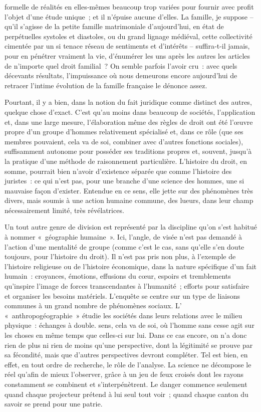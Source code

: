\documentclass[french,twoside]{book} %
\begin{document}
\label{p75} formelle de réalités en elles‑mêmes beaucoup trop variées pour fournir avec profit l’objet d’une étude unique ; et il n’épuise aucune d’elles. La famille, je suppose – qu’il s’agisse de la petite famille matrimoniale d’aujourd’hui, en état de perpétuelles systoles et diastoles, ou du grand lignage médiéval, cette collectivité cimentée par un si tenace réseau de sentiments et d’in­térêts – suffira‑t‑il jamais, pour en pénétrer vraiment la vie, d’énumérer les uns après les autres les articles de n’importe quel droit familial ? On semble parfois l’avoir cru : avec quels décevants résultats, l’impuissance où nous demeurons encore aujourd’hui de retracer l’intime évolution de la famille française le dénonce assez.\par
Pourtant, il y a bien, dans la notion du fait juridique comme distinct des autres, quelque chose d’exact. C’est qu’au moins dans beaucoup de sociétés, l’application et, dans une large mesure, l’élaboration même des règles de droit ont été l’œuvre propre d’un groupe d’hommes relativement spécialisé et, dans ce rôle (que ses membres pouvaient, cela va de soi, combiner avec d’autres fonctions sociales), suffisamment autonome pour posséder ses traditions propres et, souvent, jusqu’à la pratique d’une méthode de raisonnement particulière. L’histoire du droit, en somme, pourrait bien n’avoir d’existence séparée que comme l’histoire des juristes : ce qui n’est pas, pour une branche d’une science des hommes, une si mauvaise façon d’exister. Entendue en ce sens, elle jette sur des phéno­mènes très divers, mais soumis à une action humaine commune, des lueurs, dans leur champ nécessairement limité, très révélatrices.\par
Un tout autre genre de division est représenté par la discipline qu’on s’est habitué à nommer « géographie humaine ». Ici, l’angle, de visée n’est pas demandé à l’action d’une mentalité de groupe (comme c’est le cas, sans qu’elle s’en doute toujours, pour l’histoire du droit). Il n’est pas pris non plus, à l’exemple de l’histoire religieuse ou de l’histoire écono­mique, dans la nature spécifique d’un fait humain : croyances, émotions, effusions du cœur, espoirs et tremblements qu’inspire l’image de forces transcendantes à l’humanité ; efforts pour satisfaire et organiser les besoins matériels. L’enquête se centre sur un type de liaisons communes à un grand nombre de phénomènes sociaux. L’ « anthropogéographie » étudie les sociétés dans leurs relations avec le milieu physique : échanges à double. sens, cela va de soi, où l’homme sans cesse agit sur les choses en même temps que celles‑ci sur lui. Dans ce cas encore, on n’a donc rien de plus ni rien de moins qu’une perspective, dont la légitimité se prouve par sa fécondité, mais que d’autres perspectives devront compléter. Tel est bien, en effet, en tout ordre de recherche, le rôle de l’analyse. La science ne décompose le réel qu’afin de mieux l’observer, grâce à un jeu de feux croisés dont les rayons constamment se combinent et s’interpénè­trent. Le danger commence seulement quand chaque projecteur prétend à lui seul tout voir ; quand chaque canton du savoir se prend pour une patrie.\par
\end{document}
